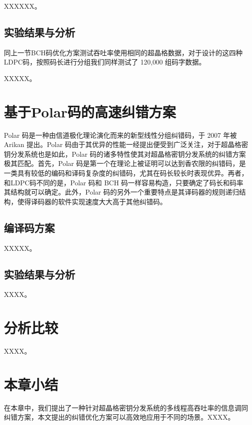 XXXXXX。


\subsection{实验结果与分析}

同上一节BCH码优化方案测试吞吐率使用相同的超晶格数据，对于设计的这四种LDPC码，按照码长进行分组我们同样测试了 120,000 组码字数据。

XXXXX。

\section{基于Polar码的高速纠错方案}

Polar 码是一种由信道极化理论演化而来的新型线性分组纠错码，于 2007 年被 Arikan 提出。Polar 码由于其优异的性能一经提出便受到广泛关注，对于超晶格密钥分发系统也是如此，Polar 码的诸多特性使其对超晶格密钥分发系统的纠错方案极其匹配。首先，Polar 码是第一个在理论上被证明可以达到香农限的纠错码，是一类具有较低的编码和译码复杂度的纠错码，尤其在码长较长时表现优异。再者，和LDPC码不同的是，Polar 码和 BCH 码一样容易构造，只要确定了码长和码率其结构就可以确定。此外，Polar 码的另外一个重要特点是其译码器的规则递归结构，使得译码器的软件实现速度大大高于其他纠错码\cite{mori2009performance}。

\subsection{编译码方案}

XXXXX。



\subsection{实验结果与分析}



XXXX。


\section{分析比较}

XXXX。




\section{本章小结}
在本章中，我们提出了一种针对超晶格密钥分发系统的多线程高吞吐率的信息调同纠错方案，本文提出的纠错优化方案可以高效地应用于不同的场景。XXXX。